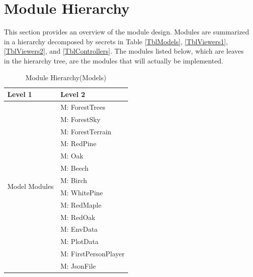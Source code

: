 \documentclass[12pt, titlepage]{article}
\newcounter{mnum}
\newcommand{\mthemnum}{M\themnum}
\begin{document}
\newpage

\section{Module Hierarchy} \label{SecMH}

This section provides an overview of the module design. Modules are summarized
in a hierarchy decomposed by secrets in Table \ref{TblModels}, \ref{TblViewers1}, \ref{TblViewers2},
and \ref{TblControllers}. The modules listed
below, which are leaves in the hierarchy tree, are the modules that will
actually be implemented.

\begin{table}[H]
\caption{Module Hierarchy(Models)}
\label{TblModels}

\centering
\begin{tabular}{p{} p{}}
\toprule
\textbf{Level 1} & \textbf{Level 2}\\
\midrule

\multirow{14}{0.3\textwidth}{Model Modules}
& {mnum} \mthemnum \label{Model1}: ForestTrees \\
& {mnum} \mthemnum \label{Model2}: ForestSky  \\
& {mnum} \mthemnum \label{Model3}: ForestTerrain \\
& {mnum} \mthemnum \label{Model4}: RedPine  \\
& {mnum} \mthemnum \label{Model5}: Oak   \\
& {mnum} \mthemnum \label{Model6}: Beech  \\
& {mnum} \mthemnum \label{Model7}: Birch  \\ 
& {mnum} \mthemnum \label{Model8}: WhitePine  \\
& {mnum} \mthemnum \label{Model9}: RedMaple \\
& {mnum} \mthemnum \label{Model10}: RedOak  \\
& {mnum} \mthemnum \label{Model11}: EnvData  \\
& {mnum} \mthemnum \label{Model12}: PlotData  \\
& {mnum} \mthemnum \label{Model13}: FirstPersonPlayer  \\
& {mnum} \mthemnum \label{Model14}: JsonFile  \\
\bottomrule

\end{tabular}

\end{table}
\end{document}
